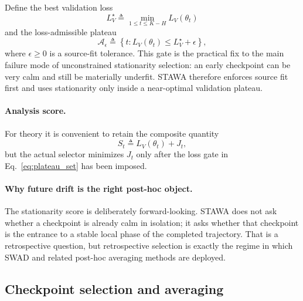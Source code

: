 \documentclass{article}
\newcommand{\stawa}{\textup{\textsc{STAWA}}}
\newcommand{\swad}{\textup{\textsc{SWAD}}}
\begin{document}
Define the best validation loss
\begin{equation}
    L_V^\star \triangleq \min_{1\le t\le K-H} L_V(\theta_t)
\end{equation}
and the loss-admissible plateau
\begin{equation}
    \mathcal{A}_{\epsilon}
    \triangleq
    \left\{
        t : L_V(\theta_t) \le L_V^\star + \epsilon
    \right\},
    \label{eq:plateau_set}
\end{equation}
where $\epsilon \ge 0$ is a source-fit tolerance. This gate is the practical fix to the main failure mode of unconstrained stationarity selection: an early checkpoint can be very calm and still be materially underfit. \stawa{} therefore enforces source fit first and uses stationarity only inside a near-optimal validation plateau.

\paragraph{Analysis score.}
For theory it is convenient to retain the composite quantity
\begin{equation}
    S_t
    \triangleq
    L_V(\theta_t) + J_t,
    \label{eq:analysis_score}
\end{equation}
but the actual selector minimizes $J_t$ only after the loss gate in Eq.~\eqref{eq:plateau_set} has been imposed.

\paragraph{Why future drift is the right post-hoc object.}
The stationarity score is deliberately forward-looking. \stawa{} does not ask whether a checkpoint is already calm in isolation; it asks whether that checkpoint is the entrance to a stable local phase of the completed trajectory. That is a retrospective question, but retrospective selection is exactly the regime in which \swad{} and related post-hoc averaging methods are deployed.

\subsection{Checkpoint selection and averaging}
\end{document}
